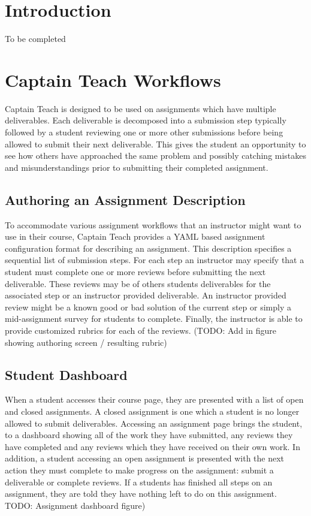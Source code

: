 \documentclass{sig-alternate}
\begin{document}

\section{Introduction}
To be completed


\section{Captain Teach Workflows}
Captain Teach is designed to be used on assignments which have multiple
deliverables. Each deliverable is decomposed into a submission step typically
followed by a student reviewing one or more other submissions before being
allowed to submit their next deliverable. This gives the student an
opportunity to see how others have approached the same problem and possibly
catching mistakes and misunderstandings prior to submitting their completed
assignment.

\subsection{Authoring an Assignment Description}
To accommodate various assignment workflows that an instructor might want to use
in their course, Captain Teach provides a YAML based assignment configuration 
format for describing an assignment. This description specifies a sequential 
list of submission steps. For each step an instructor may specify that a 
student must complete one or more reviews before submitting the next deliverable.
These reviews may be of others students deliverables for the associated step or 
an instructor provided deliverable. An instructor provided review might be a
known good or bad solution of the current step or simply a mid-assignment 
survey for students to complete. Finally, the instructor is able to provide
customized rubrics for each of the reviews. (TODO: Add in figure showing authoring screen / resulting rubric)


\subsection{Student Dashboard}
When a student accesses their course page, they are presented with a list of
open and closed assignments. A closed assignment is one which a student
is no longer allowed to submit deliverables.
Accessing an assignment page brings the student,
to a dashboard showing all of the work they have submitted, any reviews
they have completed and any reviews which they have received on their own work.
In addition, a student accessing an open assignment is presented with the next
action they must complete to make progress on the assignment: submit a 
deliverable or complete reviews. If a students has finished all steps on an
assignment, they are told they have nothing left to do on this assignment. 
TODO: Assignment dashboard figure)
\end{document}
